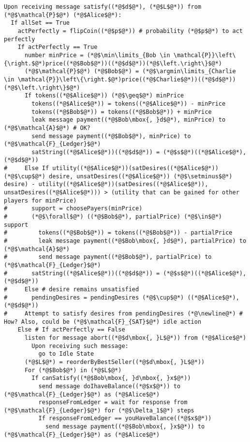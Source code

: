 \begin{lstlisting}[label=satfunc, style=numbers]
Upon receiving message satisfy((*@$d$@*), (*@$L$@*)) from (*@$\mathcal{P}$@*) (*@$Alice$@*):
  If allSet == True
    actPerfectly = flipCoin((*@$p$@*)) # probability (*@$p$@*) to act perfectly
    If actPerfectly == True
      number minPrice = (*@$\min\limits_{Bob \in \mathcal{P}}\left\{\right.$@*)price((*@$Bob$@*))((*@$d$@*))(*@$\left.\right\}$@*)
      (*@$\mathcal{P}$@*) (*@$Bob$@*) = (*@$\argmin\limits_{Charlie \in \mathcal{P}}\left\{\right.$@*)price((*@$Charlie$@*))((*@$d$@*))(*@$\left.\right\}$@*)
      If tokens((*@$Alice$@*)) (*@$\geq$@*) minPrice
        tokens((*@$Alice$@*)) = tokens((*@$Alice$@*)) - minPrice
        tokens((*@$Bob$@*)) = tokens((*@$Bob$@*)) + minPrice
        leak message payment((*@$Bob\mbox{, }d$@*), minPrice) to (*@$\mathcal{A}$@*) # OK?
        send message payment((*@$Bob$@*), minPrice) to (*@$\mathcal{F}_{Ledger}$@*)
        satString((*@$Alice$@*))((*@$d$@*)) = (*@$s$@*)((*@$Alice$@*), (*@$d$@*))
#     Else If utility((*@$Alice$@*))(satDesires((*@$Alice$@*)) (*@$\cup$@*) desire, unsatDesires((*@$Alice$@*)) (*@$\setminus$@*) desire) - utility((*@$Alice$@*))(satDesires((*@$Alice$@*)), unsatDesires((*@$Alice$@*))) > (utility that can be gained for other players for minPrice)
#       support = choosePayers(minPrice)
#       (*@$\forall$@*) ((*@$Bob$@*), partialPrice) (*@$\in$@*) support
#         tokens((*@$Bob$@*)) = tokens((*@$Bob$@*)) - partialPrice
#         leak message payment((*@$Bob\mbox{, }d$@*), partialPrice) to (*@$\mathcal{A}$@*)
#         send message payment((*@$Bob$@*), partialPrice) to (*@$\mathcal{F}_{Ledger}$@*)
#       satString((*@$Alice$@*))((*@$d$@*)) = (*@$s$@*)((*@$Alice$@*), (*@$d$@*))
#     Else # desire remains unsatisfied
#       pendingDesires = pendingDesires (*@$\cup$@*) ((*@$Alice$@*), (*@$d$@*))
#     Attempt to satisfy desires from pendingDesires (*@\newline@*) # How? Also, could be (*@$\mathcal{F}_{SAT}$@*) idle action
    Else # If actPerfectly == False
      listen for message abort((*@$d\mbox{, }L$@*)) from (*@$Alice$@*)
        Upon receiving such message:
          go to Idle State
      (*@$L$@*) = reorderByBestSeller((*@$d\mbox{, }L$@*))
      For (*@$Bob$@*) in (*@$L$@*)
        If canSatisfy((*@$Bob\mbox{, }d\mbox{, }x$@*))
          send message doIhaveBalance((*@$x$@*)) to (*@$\mathcal{F}_{Ledger}$@*) as (*@$Alice$@*)
          responseFromLedger = wait for response from (*@$\mathcal{F}_{Ledger}$@*) for (*@$\Delta_1$@*) steps
          If responseFromLedger == youHaveBalance((*@$x$@*))
            send message payment((*@$Bob\mbox{, }x$@*)) to (*@$\mathcal{F}_{Ledger}$@*) as (*@$Alice$@*)

\end{lstlisting}
